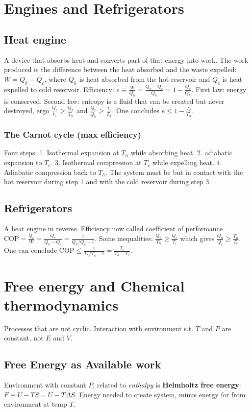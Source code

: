 \documentclass[11pt,twocolumn]{amsart}
\begin{document}
\section{Engines and Refrigerators}
\subsection{Heat engine} A device that absorbs heat and converts part of that energy into work. The work produced is the difference between the heat absorbed and the waste expelled: $W = Q_h-Q_c$, where $Q_h$ is heat absorbed from the hot reservoir and $Q_c$ is heat expelled to cold reservoir. Efficiency: $e \equiv \frac{W}{Q_h} = \frac{Q_h-Q_c}{Q_h} = 1 - \frac{Q_c}{Q_h}$. First law: energy is conserved. Second law: entropy is a fluid that can be created but never destroyed, ergo $\frac{Q_c}{t_c} \geq \frac{Q_h}{T_h}$ and $\frac{Q_c}{Q_h} \geq \frac{T_c}{T_h}$. One concludes $e \leq 1 - \frac{T_c}{T_h}$.
\subsubsection{The Carnot cycle (max efficiency)} Four steps: 1. Isothermal expansion at $T_h$ while absorbing heat. 2. adiabatic expansion to $T_c$. 3. Isothermal compression at $T_c$ while expelling heat. 4. Adiabatic compression back to $T_h$. The system must be but in contact with the hot reservoir during step 1 and with the cold reservoir during step 3.
\subsection{Refrigerators} A heat engine in reverse. Efficiency now called coefficient of performance $\text{COP}=\frac{Q_c}{W}=\frac{Q_c}{Q_h-Q_c} = \frac{1}{Q_h/Q_c -1}$. Some inequalities: $\frac{Q_h}{T_h} \geq \frac{Q_c}{T_c}$ which gives $\frac{Q_h}{Q_c} \geq \frac{T_h}{T_c}$. One can conclude $\text{COP} \leq \frac{1}{T_h/T_c -1} =\frac{T_c}{T_h - T_c}$.

\section{Free energy and Chemical thermodynamics}
Processes that are not cyclic. Interaction with environment s.t. $T$ and $P$ are constant, not $E$ and $V$.

\subsection{Free Energy as Available work}
Environment with constant $P$, related to \emph{enthalpy} is \textbf{Helmholtz free energy}: $F \equiv U - TS = U - T\Delta S$. Energy needed to create system, minus energy for from environment at temp $T$. 
\end{document}
